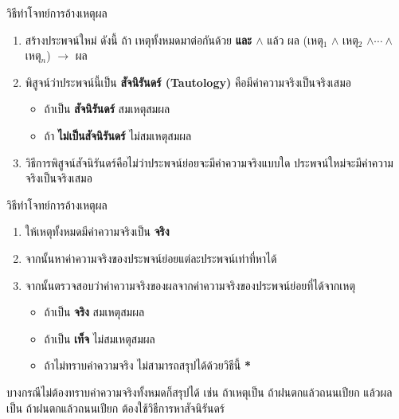 \documentclass[11pt, aspectratio=169]{beamer}
\begin{document}
\begin{frame}{วิธีทำโจทย์การอ้างเหตุผล}
  \begin{explanation}
    \begin{enumerate}
      \item สร้างประพจน์ใหม่ ดังนี้ ถ้า เหตุทั้งหมดมาต่อกันด้วย \textbf{และ $\wedge$} แล้ว ผล \newline
      (เหตุ$_1$ $\wedge$ เหตุ$_2$ $\wedge \cdots  \wedge $ เหตุ$_n$) $\rightarrow$ ผล
      \item พิสูจน์ว่าประพจน์นี้เป็น \textbf{สัจนิรันดร์ (Tautology)} คือมีค่าความจริงเป็นจริงเสมอ
      \begin{itemize}
        \item ถ้าเป็น \textbf{สัจนิรันดร์} สมเหตุสมผล 
        \item ถ้า \textbf{ไม่เป็นสัจนิรันดร์} ไม่สมเหตุสมผล
      \end{itemize}
      \item วิธีการพิสูจน์สัจนิรันดร์คือไม่ว่าประพจน์ย่อยจะมีค่าความจริงแบบใด ประพจน์ใหม่จะมีค่าความจริงเป็นจริงเสมอ
    \end{enumerate}
  \end{explanation}
\end{frame}

\begin{frame}{วิธีทำโจทย์การอ้างเหตุผล}
  \begin{intuition}
    \begin{enumerate}
      \item ให้เหตุทั้งหมดมีค่าความจริงเป็น \textbf{จริง}
      \item จากนั้นหาค่าความจริงของประพจน์ย่อยแต่ละประพจน์เท่าที่หาได้
      \item จากนั้นตรวจสอบว่าค่าความจริงของผลจากค่าความจริงของประพจน์ย่อยที่ได้จากเหตุ 
      \begin{itemize}
        \item ถ้าเป็น \textbf{จริง} สมเหตุสมผล 
        \item ถ้าเป็น \textbf{เท็จ} ไม่สมเหตุสมผล
        \item ถ้าไม่ทราบค่าความจริง ไม่สามารถสรุปได้ด้วยวิธีนี้ \textbf{*}
      \end{itemize}
    \end{enumerate}
  \end{intuition}

  \begin{exambox}[*]
    บางกรณีไม่ต้องทราบค่าความจริงทั้งหมดก็สรุปได้ เช่น ถ้าเหตุเป็น ถ้าฝนตกแล้วถนนเปียก แล้วผลเป็น ถ้าฝนตกแล้วถนนเปียก ต้องใช้วิธีการหาสัจนิรันดร์
  \end{exambox}
\end{frame}
\end{document}
